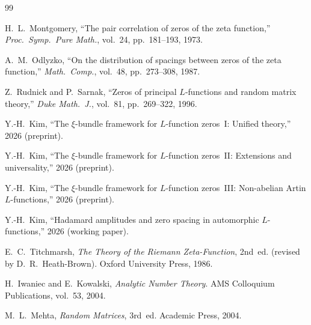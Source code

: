 \documentclass[11pt, a4paper]{article}
\theoremstyle{plain}
\theoremstyle{definition}
\begin{document}
\begin{thebibliography}{99}

H.~L.~Montgomery,
``The pair correlation of zeros of the zeta function,''
\textit{Proc.\ Symp.\ Pure Math.}, vol.~24, pp.~181--193, 1973.

A.~M.~Odlyzko,
``On the distribution of spacings between zeros of the zeta
function,''
\textit{Math.\ Comp.}, vol.~48, pp.~273--308, 1987.

Z.~Rudnick and P.~Sarnak,
``Zeros of principal $L$-functions and random matrix theory,''
\textit{Duke Math.\ J.}, vol.~81, pp.~269--322, 1996.

Y.-H.~Kim,
``The $\xi$-bundle framework for $L$-function zeros~I:
Unified theory,''
2026 (preprint).

Y.-H.~Kim,
``The $\xi$-bundle framework for $L$-function zeros~II:
Extensions and universality,''
2026 (preprint).

Y.-H.~Kim,
``The $\xi$-bundle framework for $L$-function zeros~III:
Non-abelian Artin $L$-functions,''
2026 (preprint).

Y.-H.~Kim,
``Hadamard amplitudes and zero spacing in automorphic
$L$-functions,''
2026 (working paper).

E.~C.~Titchmarsh,
\textit{The Theory of the Riemann Zeta-Function}, 2nd~ed.
(revised by D.~R.~Heath-Brown). Oxford University Press, 1986.

H.~Iwaniec and E.~Kowalski,
\textit{Analytic Number Theory}.
AMS Colloquium Publications, vol.~53, 2004.

M.~L.~Mehta,
\textit{Random Matrices}, 3rd~ed. Academic Press, 2004.

\end{thebibliography}
\end{document}
